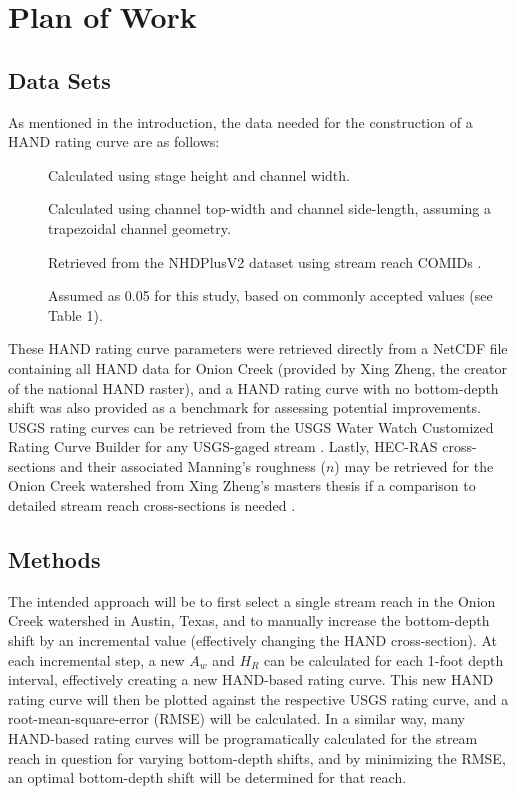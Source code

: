 \documentclass[11pt]{article}
\begin{document}
\section*{Plan of Work} %

  \subsection*{Data Sets} %

  As mentioned in the introduction, the data needed for the construction of a HAND rating curve are as follows: 

  \begin{description}
    \item[] Calculated using stage height and channel width.
    \item[] Calculated using channel top-width and channel side-length, assuming a trapezoidal channel geometry. 
    \item[] Retrieved from the NHDPlusV2 dataset using stream reach COMIDs \cite{nhdplusv2}.
    \item[] Assumed as 0.05 for this study, based on commonly accepted values (see Table 1).
  \end{description}

  These HAND rating curve parameters were retrieved directly from a NetCDF file containing all HAND data for Onion Creek (provided by Xing Zheng, the creator of the national HAND raster), and a HAND rating curve with no bottom-depth shift was also provided as a benchmark for assessing potential improvements. USGS rating curves can be retrieved from the USGS Water Watch Customized Rating Curve Builder for any USGS-gaged stream \cite{usgswaterwatch}. Lastly, HEC-RAS cross-sections and their associated Manning's roughness ($n$) may be retrieved for the Onion Creek watershed from Xing Zheng's masters thesis if a comparison to detailed stream reach cross-sections is needed \cite{xingms}.

  \subsection*{Methods} %

  The intended approach will be to first select a single stream reach in the Onion Creek watershed in Austin, Texas, and to manually increase the bottom-depth shift by an incremental value (effectively changing the HAND cross-section). At each incremental step, a new $A_w$ and $H_R$ can be calculated for each 1-foot depth interval, effectively creating a new HAND-based rating curve. This new HAND rating curve will then be plotted against the respective USGS rating curve, and a root-mean-square-error (RMSE) will be calculated. In a similar way, many HAND-based rating curves will be programatically calculated for the stream reach in question for varying bottom-depth shifts, and by minimizing the RMSE, an optimal bottom-depth shift will be determined for that reach. 
\end{document}
